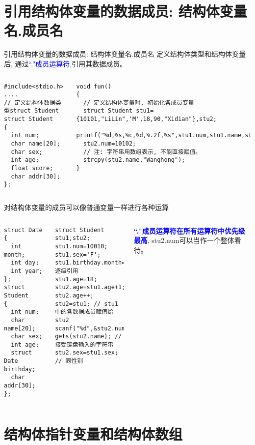 \section{引用结构体变量的数据成员: 结构体变量名.成员名}

\begin{frame}{引用结构体变量的数据成员: 结构体变量名.成员名}
定义结构体类型和结构体变量后, 通过\textcolor{blue}{``."成员运算符},引用其数据成员。
\begin{columns}[T]
\begin{lstlisting}
#include<stdio.h>
....
// 定义结构体数据类型struct Student
struct Student 
{
  int num;
  char name[20]; 
  char sex; 
  int age; 
  float score; 
  char addr[30]; 
};         
\end{lstlisting}
\begin{lstlisting}
void fun()
{
  // 定义结构体变量时, 初始化各成员变量
  struct Student stu1={10101,"LiLin",'M',18,90,"Xidian"},stu2; 
  printf("%d,%s,%c,%d,%.2f,%s",stu1.num,stu1.name,stu1.sex,stu1.age,stu1.score,stu1.addr);
  stu2.num=10102;
  // 注: 字符串用数组表示, 不能直接赋值。
  strcpy(stu2.name,"Wanghong");   
}
\end{lstlisting}
\end{columns}
\end{frame}

\begin{frame}{\small 对结构体变量的成员可以像普通变量一样进行各种运算}
\begin{columns}[T]
\begin{lstlisting}
struct Date  
{
  int month; 
  int day;   
  int year;  
}; 
struct Student 
{ 
  int num;
  char name[20];
  char sex;
  int age;
  struct Date birthday;
  char addr[30]; 
};
\end{lstlisting}
\begin{lstlisting}
struct Student stu1,stu2;
stu1.num=10010;
stu1.sex='F';
stu1.birthday.month=6;// 逐级引用
stu1.age=18;
stu2.age=stu1.age+1;
stu2.age++;
stu2=stu1; // stu1中的各数据成员赋值给stu2
scanf("%d",&stu2.num);
gets(stu2.name); // 接受键盘输入的字符串
stu2.sex=stu1.sex; // 同性别
\end{lstlisting}
\textbf{\textcolor{blue}{``."成员运算符在所有运算符中优先级最高}}, stu2.num可以当作一个整体看待。
\end{columns}
\medskip
\end{frame}

\section{结构体指针变量和结构体数组}

